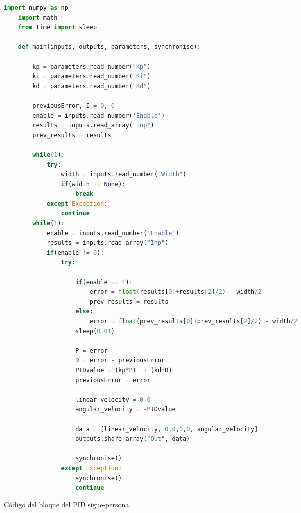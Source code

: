\begin{code}[H]
    \begin{lstlisting}[language=python]
    import numpy as np
    import math
    from time import sleep

    def main(inputs, outputs, parameters, synchronise):

        kp = parameters.read_number("Kp")
        ki = parameters.read_number("Ki")
        kd = parameters.read_number("Kd")

        previousError, I = 0, 0
        enable = inputs.read_number('Enable')
        results = inputs.read_array("Inp")
        prev_results = results

        while(1):
            try:
                width = inputs.read_number("Width")
                if(width != None):
                    break
            except Exception:
                continue
        while(1):
            enable = inputs.read_number('Enable')
            results = inputs.read_array("Inp")
            if(enable != 0):
                try:

                    if(enable == 1):
                        error = float(results[0]+results[2]/2) - width/2
                        prev_results = results
                    else:
                        error = float(prev_results[0]+prev_results[2]/2) - width/2
                    sleep(0.01)

                    P = error
                    D = error - previousError
                    PIDvalue = (kp*P)  + (kd*D)
                    previousError = error

                    linear_velocity = 0.0
                    angular_velocity = -PIDvalue

                    data = [linear_velocity, 0,0,0,0, angular_velocity]
                    outputs.share_array("Out", data)

                    synchronise()
                except Exception:
                    synchronise()
                    continue
    \end{lstlisting}
    \caption[Código bloque PID sigue-persona]{Código del bloque del PID sigue-persona.}
    \label{cod:PID_follow_person}
\end{code}
































